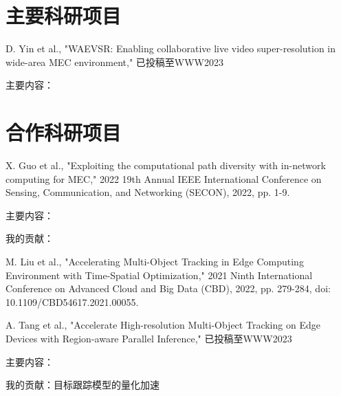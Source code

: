 \documentclass[]{deedy-resume-openfont}
\begin{document}
\begin{minipage}[t]{0.73\textwidth}


	\section{主要科研项目}
	\vspace{\topsep}
	\begin{tightemize}
		\item D. Yin et al., "WAEVSR: Enabling collaborative live video super-resolution in wide-area MEC environment," 已投稿至WWW2023
		\item 主要内容：
	\end{tightemize}
    \sectionsep

	\section{合作科研项目}
	\vspace{\topsep}
	\begin{tightemize}
		\item X. Guo et al., "Exploiting the computational path diversity with in-network computing for MEC," 2022 19th Annual IEEE International Conference on Sensing, Communication, and Networking (SECON), 2022, pp. 1-9.
		\item 主要内容：
		\item 我的贡献：
	\end{tightemize}
    \sectionsep

	\vspace{\topsep}
	\begin{tightemize}
		\item M. Liu et al., "Accelerating Multi-Object Tracking in Edge Computing Environment with Time-Spatial Optimization," 2021 Ninth International Conference on Advanced Cloud and Big Data (CBD), 2022, pp. 279-284, doi: 10.1109/CBD54617.2021.00055.
		\item A. Tang et al., "Accelerate High-resolution Multi-Object Tracking on Edge Devices with Region-aware Parallel Inference," 已投稿至WWW2023
		\item 主要内容：
		\item 我的贡献：目标跟踪模型的量化加速
	\end{tightemize}
    \sectionsep
	


\end{minipage}
\end{document}
